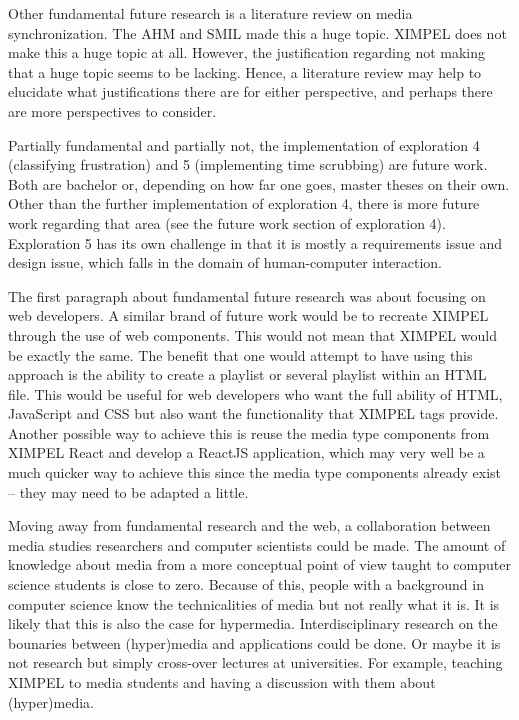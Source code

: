 Other fundamental future research is a literature review on media synchronization. The AHM and SMIL made this a huge topic. XIMPEL does not make this a huge topic at all. However, the justification regarding not making that a huge topic seems to be lacking. Hence, a literature review may help to elucidate what justifications there are for either perspective, and perhaps there are more perspectives to consider.

Partially fundamental and partially not, the implementation of exploration 4 (classifying frustration) and 5 (implementing time scrubbing) are future work. Both are bachelor or, depending on how far one goes, master theses on their own. Other than the further implementation of exploration 4, there is more future work regarding that area (see the future work section of exploration 4). Exploration 5 has its own challenge in that it is mostly a requirements issue and design issue, which falls in the domain of human-computer interaction.

The first paragraph about fundamental future research was about focusing on web developers. A similar brand of future work would be to recreate XIMPEL through the use of web components. This would not mean that XIMPEL would be exactly the same. The benefit that one would attempt to have using this approach is the ability to create a playlist or several playlist within an HTML file. This would be useful for web developers who want the full ability of HTML, JavaScript and CSS but also want the functionality that XIMPEL tags provide. Another possible way to achieve this is reuse the media type components from XIMPEL React and develop a ReactJS application, which may very well be a much quicker way to achieve this since the media type components already exist -- they may need to be adapted a little.

Moving away from fundamental research and the web, a collaboration between media studies researchers and computer scientists could be made. The amount of knowledge about media from a more conceptual point of view taught to computer science students is close to zero. Because of this, people with a background in computer science know the technicalities of media but not really what it is. It is likely that this is also the case for hypermedia. Interdisciplinary research on the bounaries between (hyper)media and applications could be done. Or maybe it is not research but simply cross-over lectures at universities. For example, teaching XIMPEL to media students and having a discussion with them about (hyper)media.

